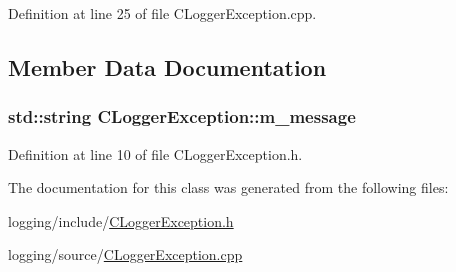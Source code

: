 Definition at line 25 of file C\-Logger\-Exception.\-cpp.



\subsection{Member Data Documentation}
\hypertarget{classCLoggerException_a4bbe88a45b230e4f6ca3246999c8348a}{
\subsubsection[{m\-\_\-message}]{\setlength{\rightskip}{0pt plus 5cm}std\-::string C\-Logger\-Exception\-::m\-\_\-message\hspace{0.3cm}{\ttfamily [protected]}}}\label{classCLoggerException_a4bbe88a45b230e4f6ca3246999c8348a}


Definition at line 10 of file C\-Logger\-Exception.\-h.



The documentation for this class was generated from the following files\-:\begin{DoxyCompactItemize}
\item 
logging/include/\hyperlink{CLoggerException_8h}{C\-Logger\-Exception.\-h}\item 
logging/source/\hyperlink{CLoggerException_8cpp}{C\-Logger\-Exception.\-cpp}\end{DoxyCompactItemize}
